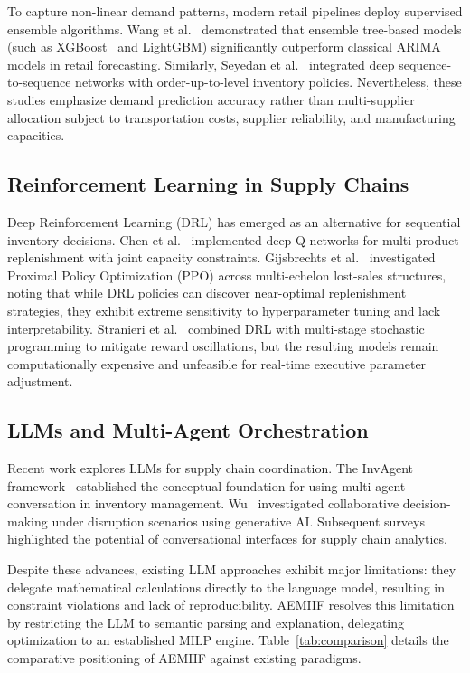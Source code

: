 \documentclass[conference]{IEEEtran}
\begin{document}
To capture non-linear demand patterns, modern retail pipelines deploy supervised ensemble algorithms. Wang et al.~\cite{wang2023} demonstrated that ensemble tree-based models (such as XGBoost~\cite{chen2016} and LightGBM) significantly outperform classical ARIMA models in retail forecasting. Similarly, Seyedan et al.~\cite{seyedan2023} integrated deep sequence-to-sequence networks with order-up-to-level inventory policies. Nevertheless, these studies emphasize demand prediction accuracy rather than multi-supplier allocation subject to transportation costs, supplier reliability, and manufacturing capacities.

\subsection{Reinforcement Learning in Supply Chains}
Deep Reinforcement Learning (DRL) has emerged as an alternative for sequential inventory decisions. Chen et al.~\cite{chen2022} implemented deep Q-networks for multi-product replenishment with joint capacity constraints. Gijsbrechts et al.~\cite{gijsbrechts2022} investigated Proximal Policy Optimization (PPO) across multi-echelon lost-sales structures, noting that while DRL policies can discover near-optimal replenishment strategies, they exhibit extreme sensitivity to hyperparameter tuning and lack interpretability. Stranieri et al.~\cite{stranieri2023} combined DRL with multi-stage stochastic programming to mitigate reward oscillations, but the resulting models remain computationally expensive and unfeasible for real-time executive parameter adjustment.

\subsection{LLMs and Multi-Agent Orchestration}
Recent work explores LLMs for supply chain coordination. The InvAgent framework~\cite{invagent2024} established the conceptual foundation for using multi-agent conversation in inventory management. Wu~\cite{wu2025} investigated collaborative decision-making under disruption scenarios using generative AI. Subsequent surveys~\cite{ijpr2026a, ijpr2026b} highlighted the potential of conversational interfaces for supply chain analytics.

Despite these advances, existing LLM approaches exhibit major limitations: they delegate mathematical calculations directly to the language model, resulting in constraint violations and lack of reproducibility. AEMIIF resolves this limitation by restricting the LLM to semantic parsing and explanation, delegating optimization to an established MILP engine. Table~\ref{tab:comparison} details the comparative positioning of AEMIIF against existing paradigms.
\end{document}
